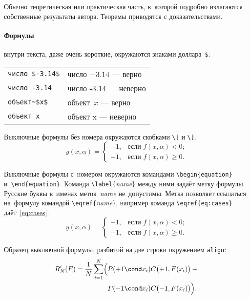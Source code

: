 Обычно теоретическая или практическая часть,
в~которой подробно излагаются собственные результаты автора.
Теоремы приводятся с доказательствами.

\paragraph{Формулы}
внутри текста, даже очень короткие, окружаются знаками доллара~\verb'$':

\begin{center}
    \begin{tabular}{l|l}
        \verb'число $-3.14$' & число $-3.14$ --- верно\\
        \verb'число -3.14'   & число -3.14 --- неверно   \\
        \verb'объект~$x$'    & объект~$x$ --- верно    \\
        \verb'объект x'      & объект x --- неверно
    \end{tabular}
\end{center}

Выключные формулы без номера окружаются скобками \verb'\[' и \verb'\]'.
\[
    y(x,\alpha) =
    \begin{cases}
        -1, & \text{если } f(x,\alpha)<0;  \\
        +1, & \text{если } f(x,\alpha)\geq 0.
    \end{cases}
\]

Выключные формулы с~номером окружаются командами
\verb'\begin{equation}' и~\verb'\end{equation}'.
Команда \verb'\label{'\emph{name}\verb'}' между ними
задаёт метку формулы.
Русские буквы в~именах меток~\emph{name} не~допустимы.
Метка позволяет ссылаться на~формулу командой
\verb'\eqref{'\emph{name}\verb'}',
например команда \verb'\eqref{eq:cases}' даёт~\eqref{eq:cases}.
\begin{equation}
\label{eq:cases}
    y(x,\alpha) =
    \begin{cases}
        -1, & \text{если } f(x,\alpha)<0;  \\
        +1, & \text{если } f(x,\alpha)\geq 0.
    \end{cases}
\end{equation}

Образец выключной формулы, разбитой на две строки окружением \verb'align':
\begin{align}
    R'_N(F)
        = \frac1N \sum_{i=1}^N
        \Bigl(
            & P(+1\cond x_i) C\bigl(+1,F(x_i)\bigr)+{}
        \notag %
    \\
        \label{eq:R(F)}
            & P(-1\cond x_i) C\bigl(-1,F(x_i)\bigr)
        \Bigr).
\end{align}

